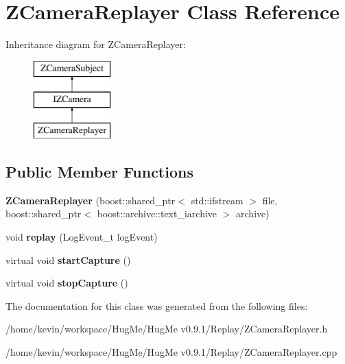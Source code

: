 \hypertarget{classZCameraReplayer}{
\section{ZCameraReplayer Class Reference}
\label{classZCameraReplayer}
}
Inheritance diagram for ZCameraReplayer:\begin{figure}[H]
\begin{center}
\leavevmode
\includegraphics[height=3.000000cm]{classZCameraReplayer}
\end{center}
\end{figure}
\subsection*{Public Member Functions}
\begin{DoxyCompactItemize}
\item 
\hypertarget{classZCameraReplayer_a3cf08f3105a04e6cb143f762a55bafd5}{
{\bfseries ZCameraReplayer} (boost::shared\_\-ptr$<$ std::ifstream $>$ file, boost::shared\_\-ptr$<$ boost::archive::text\_\-iarchive $>$ archive)}
\label{classZCameraReplayer_a3cf08f3105a04e6cb143f762a55bafd5}

\item 
\hypertarget{classZCameraReplayer_af867b41ba331deca1e88c6b6ded547e6}{
void {\bfseries replay} (LogEvent\_\-t logEvent)}
\label{classZCameraReplayer_af867b41ba331deca1e88c6b6ded547e6}

\item 
\hypertarget{classZCameraReplayer_aa5ac01ea8f9f47b51cf92ad0aa0d7fc4}{
virtual void {\bfseries startCapture} ()}
\label{classZCameraReplayer_aa5ac01ea8f9f47b51cf92ad0aa0d7fc4}

\item 
\hypertarget{classZCameraReplayer_af25eba02746ce6c8f4765c6466c3841e}{
virtual void {\bfseries stopCapture} ()}
\label{classZCameraReplayer_af25eba02746ce6c8f4765c6466c3841e}

\end{DoxyCompactItemize}


The documentation for this class was generated from the following files:\begin{DoxyCompactItemize}
\item 
/home/kevin/workspace/HugMe/HugMe v0.9.1/Replay/ZCameraReplayer.h\item 
/home/kevin/workspace/HugMe/HugMe v0.9.1/Replay/ZCameraReplayer.cpp\end{DoxyCompactItemize}
